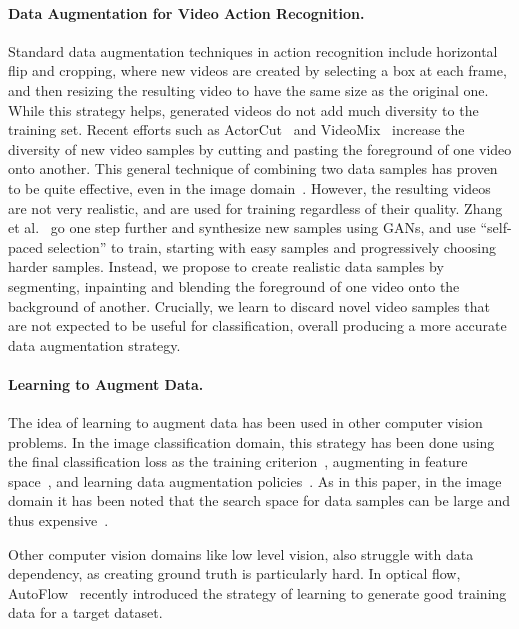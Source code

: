 \documentclass[runningheads]{llncs}
\begin{document}
\paragraph{Data Augmentation for Video Action Recognition.}
Standard data augmentation techniques in action recognition include horizontal flip and cropping, where new videos are created by selecting a box at each frame, and then resizing the resulting video to have the same size as the original one. While this strategy helps, generated videos do not add much diversity to the training set. 
Recent efforts such as ActorCut~\cite{actorcut} and VideoMix~\cite{videomix} increase the diversity of new video samples by cutting and pasting the foreground of one video onto another. This general technique of combining two data samples has proven to be quite effective, even in the image domain~\cite{yun2019cutmix}. However, the resulting videos are not very realistic, and are used for training regardless of their quality. Zhang et al.~\cite{aug_gans} go one step further and synthesize new samples using GANs, and use ``self-paced selection'' to train, starting with easy samples and progressively choosing harder samples. Instead, we propose to create realistic data samples by segmenting, inpainting and blending the foreground of one video onto the background of another. Crucially, we learn to discard novel video samples that are not expected to be useful for classification, overall producing a more accurate data augmentation strategy. 








\paragraph{Learning to Augment Data.} 
The idea of learning to augment data has been used in other computer vision problems. In the image classification domain, this strategy has been done using the final classification loss as the training criterion~\cite{Lemley2017SmartAL}, augmenting in feature space~\cite{devries2017dataset}, and learning data augmentation policies~\cite{Cubuk_2019_CVPR}. As in this paper, in the image domain it has been noted that the search space for data samples can be  large and thus expensive~\cite{NEURIPS2020_auto}. 

Other computer vision domains like low level vision, also struggle with data dependency, as creating ground truth is particularly hard. In optical flow, AutoFlow~\cite{sun2021autoflow} recently introduced the strategy of learning to generate good training data for a target dataset. 
 
\end{document}
